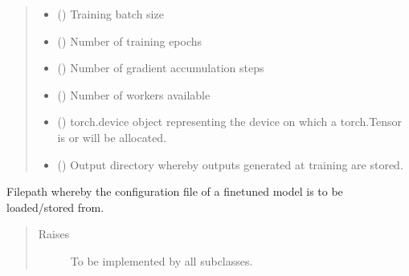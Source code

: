 \documentclass[letterpaper,10pt,english]{sphinxmanual}
\begin{document}
\begin{fulllineitems}
\begin{fulllineitems}
\begin{quote}
\begin{description}
\begin{itemize}
\item {} 
\sphinxAtStartPar
{} () \textendash{} Training batch size

\item {} 
\sphinxAtStartPar
{} () \textendash{} Number of training epochs

\item {} 
\sphinxAtStartPar
{} () \textendash{} Number of gradient accumulation steps

\item {} 
\sphinxAtStartPar
{} () \textendash{} Number of workers available

\item {} 
\sphinxAtStartPar
{} () \textendash{} torch.device object representing the device on which a torch.Tensor is or
will be allocated.

\item {} 
\sphinxAtStartPar
{} (\sphinxstyleliteralemphasis{\sphinxupquote{{[}}}\sphinxstyleliteralemphasis{\sphinxupquote{, }}\sphinxstyleliteralemphasis{\sphinxupquote{{]}}}) \textendash{} Output directory whereby outputs generated at training are stored.

\end{itemize}

\end{description}\end{quote}

\end{fulllineitems}


\begin{fulllineitems}
\label{\detokenize{code:gpt2_summarizer.GPT2Summarizer._config_file}}
\sphinxAtStartPar
Filepath whereby the configuration file of a fine\sphinxhyphen{}tuned model is to be loaded/stored
from.
\begin{quote}\begin{description}
\item[{Raises}] \leavevmode
\sphinxAtStartPar
{} \textendash{} To be implemented by all subclasses.


\end{description}
\end{quote}
\end{fulllineitems}
\end{fulllineitems}
\end{document}
